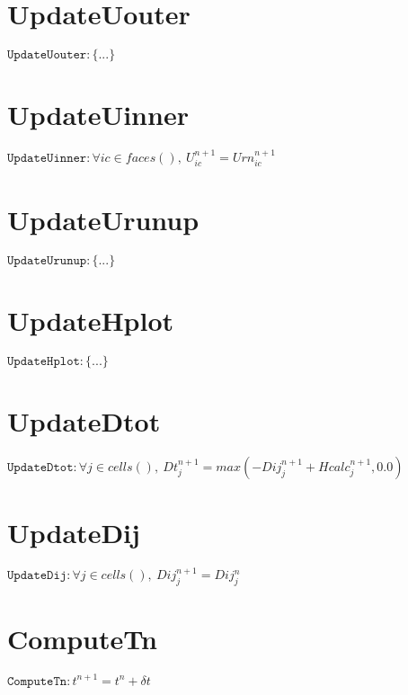 \documentclass[11pt]{article}
\begin{document}
\section{UpdateUouter}
$\texttt{UpdateUouter} : \{ ... \}$


\section{UpdateUinner}
$\texttt{UpdateUinner} : \forall{ic\in faces()}, \ U^{n+1}_{ic} = Urn^{n+1}_{ic}$


\section{UpdateUrunup}
$\texttt{UpdateUrunup} : \{ ... \}$


\section{UpdateHplot}
$\texttt{UpdateHplot} : \{ ... \}$


\section{UpdateDtot}
$\texttt{UpdateDtot} : \forall{j\in cells()}, \ Dt^{n+1}_{j} = max\left(-Dij^{n+1}_{j} + Hcalc^{n+1}_{j},0.0\right)$


\section{UpdateDij}
$\texttt{UpdateDij} : \forall{j\in cells()}, \ Dij^{n+1}_{j} = Dij^{n}_{j}$


\section{ComputeTn}
$\texttt{ComputeTn} : t^{n+1} = t^{n} + \delta t$
\end{document}
